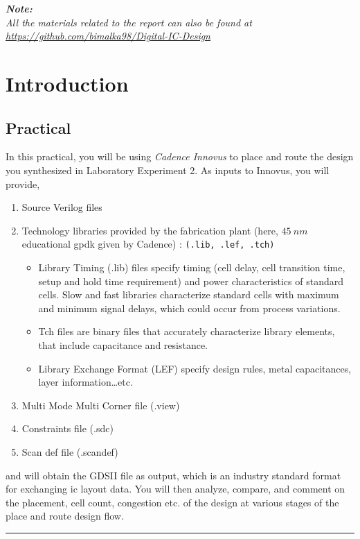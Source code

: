 \documentclass[a4paper,11pt]{article}%
\begin{document}


\pagebreak

\tableofcontents
\vfill
\textit{\textbf{Note:}}\\
\textit{All the materials related to the report can also be found at \url{https://github.com/bimalka98/Digital-IC-Design}}

\pagebreak
\listoffigures
\listoftables




\pagebreak
\section{Introduction}

\subsection{Practical}
In this practical, you will be using \textit{Cadence Innovus} to place and route the design you synthesized in Laboratory Experiment 2. As inputs to Innovus, you will provide,

\begin{enumerate}
	\item Source Verilog files
	\item Technology libraries provided by the fabrication plant (here, $45~nm$ educational \ac{gpdk} given by Cadence) : {\tt (.lib, .lef, .tch)}
	
	\begin{itemize}
		\item Library Timing (.lib) files specify timing (cell delay, cell transition time, setup and hold time requirement) and power characteristics of standard cells. Slow and fast libraries 	characterize standard cells with maximum and minimum signal delays, which could occur from process variations.

		\item Tch files are binary files that accurately characterize library elements, that include  capacitance and resistance.
		
		\item Library Exchange Format (LEF) specify design rules, metal capacitances, layer information…etc.
	\end{itemize}
	
	\item Multi Mode Multi Corner file (.view)
	\item Constraints file (.sdc)
	\item Scan \ac{def} file (.scandef)
\end{enumerate}

and will obtain the GDSII file as output, which is an industry standard format for exchanging \ac{ic} layout data. You will then analyze, compare, and comment on the placement, cell count, congestion etc. of the design at various stages of the place and route design flow.

\pagebreak
\vfill
\hrule
{\small


}
\end{document}
